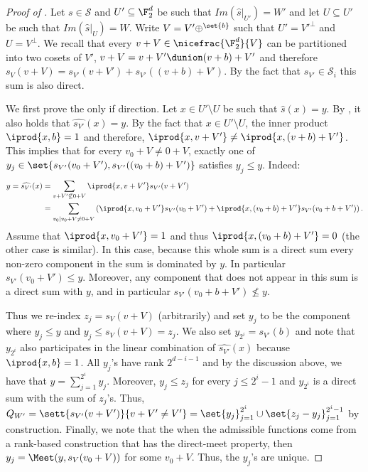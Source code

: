 \begin{proof}[Proof of ]
    Let \(s \in \mathcal{S}\) and \(U' \subseteq \F_2^{d}\) be such that \(Im(\widehat{s}|_{U'}) = W'\) and let \(U \subseteq U'\) be such that \(Im(\widehat{s}|_{U}) = W\). Write \(V = V' \oplus \sp \set{b}\) such that \(U'=V'^{\bot}\) and \(U=V^\bot\). We recall that every \(v+V \in \nicefrac{\F_2^d}{V}\) can be partitioned into two cosets of \(V'\), \(v+V = v+V' \dunion (v+b)+V'\) and therefore \(s_V(v+V) = s_{V'}(v+V') + s_{V'}((v+b)+V')\). By the fact that \(s_{V'} \in \mathcal{S}_i\) this sum is also direct.
    
    We first prove the only if direction. Let \(x \in U' \setminus U\) be such that \(\widehat{s}(x)=y\). By , it also holds that \(\widehat{s_{V'}}(x)=y\). By the fact that \(x \in U' \setminus U\), the inner product \(\iprod{x,b} = 1\) and therefore, \(\iprod{x,v+V'} \ne \iprod{x,(v+b)+V'}\). This implies that for every \(v_0+V \ne 0+V\), exactly one of \(y_j \in \set{s_{V'}(v_0+V'), s_{V'}((v_0+b)+V')}\) satisfies \(y_j \leq y\). Indeed:
    \begin{align*}
        y = \widehat{s_{V'}}(x) &= \sum_{v+V' \not\subseteq 0+V} \iprod{x,v+V'}s_{V'}(v+V') \\
    &= \sum_{v_0 \mid v_0+V\neq 0+V} \left( \iprod{x,v_0+V'}s_{V'}(v_0+V') + \iprod{x,(v_0+b)+V'}s_{V'}(v_0+b+V')\right).
    \end{align*}
Assume that \(\iprod{x,v_0+V'}=1\) and thus \(\iprod{x,(v_0+b)+V'} = 0\) (the other case is similar). In this case, because this whole sum is a direct sum every non-zero component in the sum is dominated by $y$. In particular \(s_{V'}(v_0+V') \leq y\). Moreover, any component that does not appear in this sum is a direct sum with \(y\), and in particular \(s_{V'}(v_0+b+V') \not \leq y\).

Thus we re-index \(z_j = s_V(v+V)\) (arbitrarily) and set \(y_j\) to be the component where \(y_j \leq y\) and \(y_j \leq s_V(v+V) = z_j\). We also set \(y_{2^i} = s_{V'}(b)\) and note that \(y_{2^i}\) also participates in the linear combination of \(\widehat{s_{V'}}(x)\) because \(\iprod{x,b}=1\). All \(y_j\)'s have rank \(2^{d-i-1}\) and by the discussion above, we have that \(y = \sum_{j=1}^{2^i} y_j\). Moreover, \(y_j \leq z_j\) for every \(j \leq 2^i-1\) and \(y_{2^i}\) is a direct sum with the sum of \(z_j\)'s. Thus, \(Q_{W'} = \sett{s_{V'}(v+V')}{v+V' \ne V'} = \set{y_j}_{j=1}^{2^i} \cup \set{z_j-y_j}_{j=1}^{2^i - 1}\) by construction. Finally, we note that the when the admissible functions come from a rank-based construction that has the direct-meet property, then \(y_j = \Meet(y,s_{V}(v_0+V))\) for some \(v_0 + V\). Thus, the \(y_j\)'s are unique.


\end{proof}
